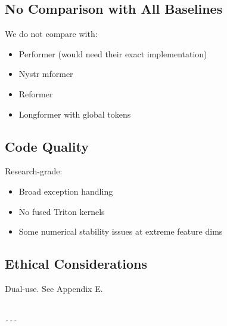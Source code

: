 \subsection{No Comparison with All Baselines}

We do not compare with:
\begin{itemize}
\item Performer (would need their exact implementation)
\item Nystr mformer
\item Reformer
\item Longformer with global tokens

\end{itemize}
\subsection{Code Quality}

Research-grade:
\begin{itemize}
\item Broad exception handling
\item No fused Triton kernels
\item Some numerical stability issues at extreme feature dims

\end{itemize}
\subsection{Ethical Considerations}

Dual-use. See Appendix E.
\begin{lstlisting}

---
\end{lstlisting}